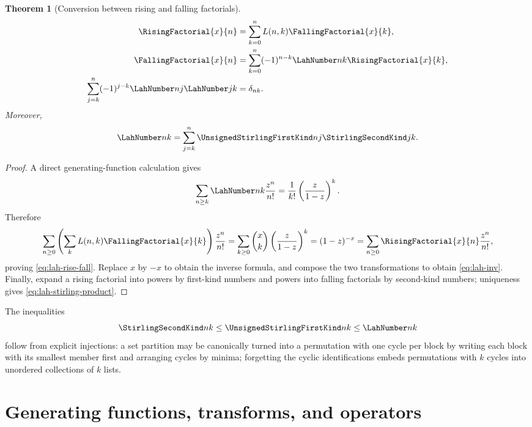 \documentclass[11pt,a4paper,oneside,openany]{book}
\newtheorem{theorem}{Theorem}[chapter]
\theoremstyle{definition}
\theoremstyle{remark}
\begin{document}
\begin{theorem}[Conversion between rising and falling factorials]\label{thm:lah-conv}
\begin{align}
 \RisingFactorial{x}{n}&=\sum_{k=0}^nL(n,k)\FallingFactorial{x}{k},\label{eq:lah-rise-fall}\\
 \FallingFactorial{x}{n}&=\sum_{k=0}^n(-1)^{n-k}\LahNumber nk\RisingFactorial{x}{k},\label{eq:lah-fall-rise}\\
 \sum_{j=k}^n(-1)^{j-k}\LahNumber nj\LahNumber jk&=\delta_{nk}.\label{eq:lah-inv}
\end{align}
Moreover,
\begin{equation}\label{eq:lah-stirling-product}
 \LahNumber nk=\sum_{j=k}^n\UnsignedStirlingFirstKind nj\StirlingSecondKind jk.
\end{equation}
\end{theorem}
\begin{proof}
A direct generating-function calculation gives
\[
 \sum_{n\ge k}\LahNumber nk\frac{z^n}{n!}
 =\frac1{k!}\left(\frac{z}{1-z}\right)^k.
\]
Therefore
\[
 \sum_{n\ge0}\left(\sum_kL(n,k)\FallingFactorial{x}{k}\right)\frac{z^n}{n!}
 =\sum_{k\ge0}\binom{x}{k}\left(\frac{z}{1-z}\right)^k
 =(1-z)^{-x}
 =\sum_{n\ge0}\RisingFactorial{x}{n}\frac{z^n}{n!},
\]
proving \cref{eq:lah-rise-fall}.  Replace $x$ by $-x$ to obtain the inverse formula,
and compose the two transformations to obtain \cref{eq:lah-inv}.  Finally, expand a
rising factorial into powers by first-kind numbers and powers into falling factorials
by second-kind numbers; uniqueness gives \cref{eq:lah-stirling-product}.
\end{proof}

The inequalities
\begin{equation}\label{eq:stirling-lah-ineq}
 \StirlingSecondKind nk\le\UnsignedStirlingFirstKind nk\le \LahNumber nk
\end{equation}
follow from explicit injections: a set partition may be canonically turned into a
permutation with one cycle per block by writing each block with its smallest member
first and arranging cycles by minima; forgetting the cyclic identifications embeds
permutations with $k$ cycles into unordered collections of $k$ lists.


\chapter{Generating functions, transforms, and operators}
\label{ch:stirling-gf}
\end{document}
